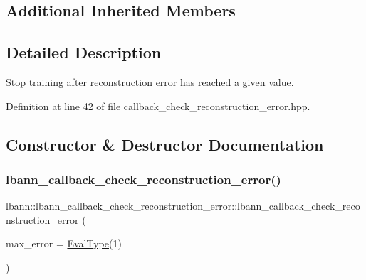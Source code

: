 \subsection*{Additional Inherited Members}


\subsection{Detailed Description}
Stop training after reconstruction error has reached a given value. 

Definition at line 42 of file callback\+\_\+check\+\_\+reconstruction\+\_\+error.\+hpp.



\subsection{Constructor \& Destructor Documentation}
\mbox{\label{classlbann_1_1lbann__callback__check__reconstruction__error_aaed51def6fe5ba7093e3d2cc41637a2a}} 
\subsubsection{\texorpdfstring{lbann\+\_\+callback\+\_\+check\+\_\+reconstruction\+\_\+error()}{lbann\_callback\_check\_reconstruction\_error()}\hspace{0.1cm}{\footnotesize\ttfamily [1/2]}}
{\footnotesize\ttfamily lbann\+::lbann\+\_\+callback\+\_\+check\+\_\+reconstruction\+\_\+error\+::lbann\+\_\+callback\+\_\+check\+\_\+reconstruction\+\_\+error (\begin{DoxyParamCaption}\item[{\hyperlink{base_8hpp_a3266f5ac18504bbadea983c109566867}{Eval\+Type}}]{max\+\_\+error = {\ttfamily \hyperlink{base_8hpp_a3266f5ac18504bbadea983c109566867}{Eval\+Type}(1)} }\end{DoxyParamCaption})}



